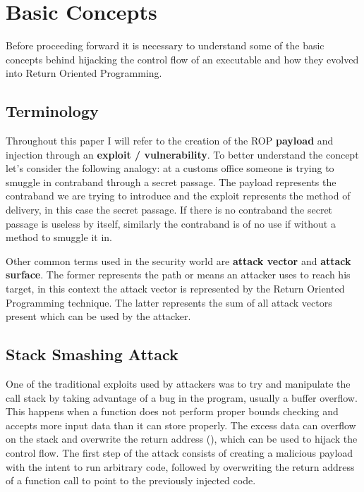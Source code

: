 \chapter{Basic Concepts}
\label{chapter:intro}

Before proceeding forward it is necessary to understand some of the basic concepts behind hijacking the control flow of an executable and how they evolved into Return Oriented Programming.

\section{Terminology}
\label{sec:payload}

Throughout this paper I will refer to the creation of the ROP \textbf{payload} and injection through an \textbf{exploit / vulnerability}. To better understand the concept let's consider the following analogy: at a customs office someone is trying to smuggle in contraband through a secret passage. The payload represents the contraband we are trying to introduce and the exploit represents the method of delivery, in this case the secret passage. If there is no contraband the secret passage is useless by itself, similarly the contraband is of no use if without a method to smuggle it in.

Other common terms used in the security world are \textbf{attack vector} and \textbf{attack surface}. The former represents the path or means an attacker uses to reach his target, in this context the attack vector is represented by the Return Oriented Programming technique. The latter represents the sum of all attack vectors present which can be used by the attacker.

\section{Stack Smashing Attack}
\label{sec:stacksmash}

One of the traditional exploits\cite{aleph1996stacksmash} used by attackers was to try and manipulate the call stack by taking advantage of a bug in the program, usually a buffer overflow. This happens when a function does not perform proper bounds checking and accepts more input data than it can store properly. The excess data can overflow on the stack and overwrite the return address (), which can be used to hijack the control flow. The first step of the attack consists of creating a malicious payload with the intent to run arbitrary code, followed by overwriting the return address of a function call to point to the previously injected code.

